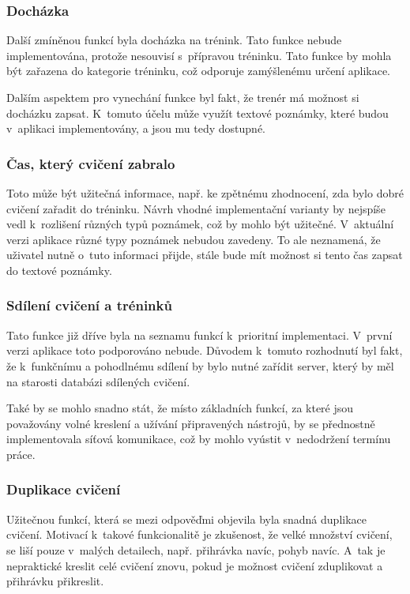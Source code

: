\documentclass[thesis=B,czech]{FITthesis}[2012/06/26]
\begin{document}
\subsubsection{Docházka}

	Další zmíněnou funkcí byla docházka na trénink. Tato funkce nebude implementována, protože nesouvisí s~přípravou tréninku. Tato funkce by mohla být zařazena do kategorie  tréninku, což odporuje zamýšlenému určení aplikace.

	Dalším aspektem pro vynechání funkce byl fakt, že trenér má možnost si docházku zapsat. K~tomuto účelu může využít textové poznámky, které budou v~aplikaci implementovány, a jsou mu tedy dostupné.

\subsubsection{Čas, který cvičení zabralo}

	Toto může být užitečná informace, např. ke zpětnému zhodnocení, zda bylo dobré cvičení zařadit do tréninku. Návrh vhodné implementační varianty by nejspíše vedl k~rozlišení různých typů poznámek, což by mohlo být užitečné. V~aktuální verzi aplikace různé typy poznámek nebudou zavedeny. To ale neznamená, že uživatel nutně o~tuto informaci přijde, stále bude mít možnost si tento čas zapsat do textové poznámky.

\subsubsection{Sdílení cvičení a tréninků}

	Tato funkce již dříve byla na seznamu funkcí k~prioritní implementaci. V~první verzi aplikace toto podporováno nebude. Důvodem k~tomuto rozhodnutí byl fakt, že k~funkčnímu a pohodlnému sdílení by bylo nutné zařídit server, který by měl na starosti databázi sdílených cvičení.

	Také by se mohlo snadno stát, že místo základních funkcí, za které jsou považovány volné kreslení a užívání připravených nástrojů, by se přednostně implementovala síťová komunikace, což by mohlo vyústit v~nedodržení termínu práce.

\subsubsection{Duplikace cvičení}

	Užitečnou funkcí, která se mezi odpověďmi objevila byla snadná duplikace cvičení. Motivací k~takové funkcionalitě je zkušenost, že velké množství cvičení, se liší pouze v~malých detailech, např. přihrávka navíc, pohyb navíc. A~tak je nepraktické kreslit celé cvičení znovu, pokud je možnost cvičení zduplikovat a přihrávku přikreslit.
\end{document}
